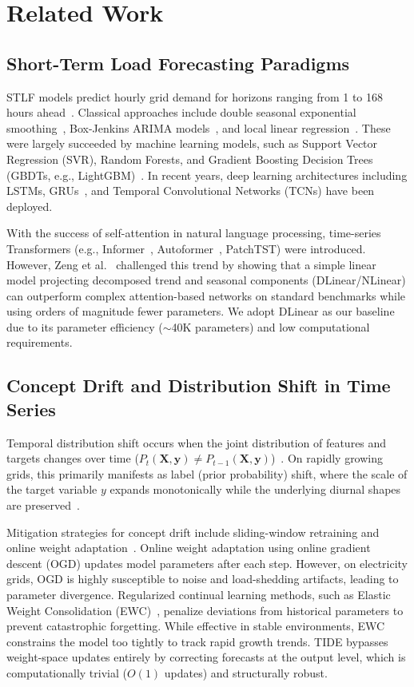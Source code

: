 \documentclass[11pt,letterpaper]{article}
\begin{document}
\section{Related Work}
\label{sec:related}

\subsection{Short-Term Load Forecasting Paradigms}
STLF models predict hourly grid demand for horizons ranging from 1 to 168 hours ahead~\cite{hippert2001neural}. Classical approaches include double seasonal exponential smoothing~\cite{taylor2003short}, Box-Jenkins ARIMA models~\cite{box2015time}, and local linear regression~\cite{mbamalu1993load}. These were largely succeeded by machine learning models, such as Support Vector Regression (SVR), Random Forests, and Gradient Boosting Decision Trees (GBDTs, e.g., LightGBM)~\cite{sobhani2020electricity}. In recent years, deep learning architectures including LSTMs, GRUs~\cite{khodayar2019rough}, and Temporal Convolutional Networks (TCNs) have been deployed. 

With the success of self-attention in natural language processing, time-series Transformers (e.g., Informer~\cite{zhou2021informer}, Autoformer~\cite{wu2021autoformer}, PatchTST) were introduced. However, Zeng et al.~\cite{zeng2023transformers} challenged this trend by showing that a simple linear model projecting decomposed trend and seasonal components (DLinear/NLinear) can outperform complex attention-based networks on standard benchmarks while using orders of magnitude fewer parameters. We adopt DLinear as our baseline due to its parameter efficiency ($\sim$40K parameters) and low computational requirements.

\subsection{Concept Drift and Distribution Shift in Time Series}
Temporal distribution shift occurs when the joint distribution of features and targets changes over time ($P_t(\mathbf{X}, \mathbf{y}) \neq P_{t-1}(\mathbf{X}, \mathbf{y})$)~\cite{gama2014survey, webb2016characterizing}. On rapidly growing grids, this primarily manifests as label (prior probability) shift, where the scale of the target variable $y$ expands monotonically while the underlying diurnal shapes are preserved~\cite{lu2018learning}.

Mitigation strategies for concept drift include sliding-window retraining and online weight adaptation~\cite{gama2014survey}. Online weight adaptation using online gradient descent (OGD) updates model parameters after each step. However, on electricity grids, OGD is highly susceptible to noise and load-shedding artifacts, leading to parameter divergence. Regularized continual learning methods, such as Elastic Weight Consolidation (EWC)~\cite{lu2018learning}, penalize deviations from historical parameters to prevent catastrophic forgetting. While effective in stable environments, EWC constrains the model too tightly to track rapid growth trends. TIDE bypasses weight-space updates entirely by correcting forecasts at the output level, which is computationally trivial ($O(1)$ updates) and structurally robust.
\end{document}
